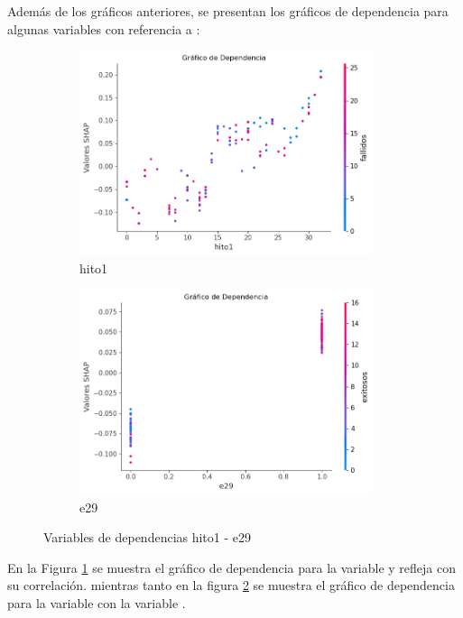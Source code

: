 Además de los gráficos anteriores, se presentan los gráficos de dependencia para algunas variables con referencia a :

\begin{figure}[H]

    \begin{subfigure}{0.5\textwidth}
        \includegraphics[width=0.9\linewidth, height=6cm]{img/shap_rf/hito1.png}
        \caption{hito1}
        \label{fig:dependencia_hito1}
    \end{subfigure}
    \begin{subfigure}{0.5\textwidth}
        \includegraphics[width=0.9\linewidth, height=6cm]{img/shap_rf/e29.png}
        \caption{e29}
        \label{fig:dependencia_e29}
    \end{subfigure}

    \caption{Variables de dependencias hito1 - e29}
    \label{fig:image2}
\end{figure}

En la Figura \ref{fig:dependencia_hito1} se muestra el gráfico de dependencia para la variable  y refleja  con su correlación. mientras tanto en la figura \ref{fig:dependencia_e29} se muestra el gráfico de dependencia para la variable  con la variable .

